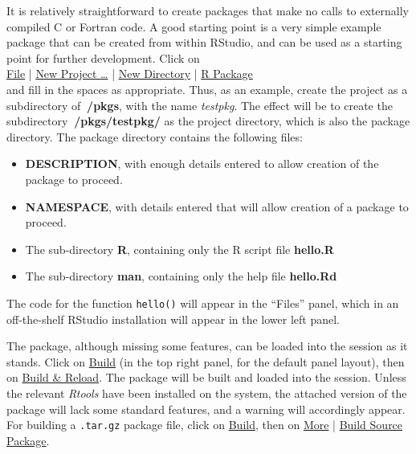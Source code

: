 \documentclass{tufte-book}\usepackage[]{graphicx}\usepackage[]{color}
\newcommand{\txtt}[1]{\texttt{#1}}
\begin{document}
It is relatively straightforward to create packages that make no calls
to externally compiled C or Fortran code. A good starting point is a
very simple example package that can be created from within RStudio,
and can be used as a starting point for further development.
Click on\\
\underline{File} | \underline{New Project \ldots} |
\underline{New Directory} | \underline{R Package} \\
\noindent and fill in the spaces as appropriate.  Thus, as an example,
create the project as a subdirectory of \textbf{$~$/pkgs}, with the
name {\em testpkg}.  The effect will be to create the subdirectory
\textbf{$~$/pkgs/testpkg/} as the project directory, which is also
the package directory.  The package directory contains the following
files:
\begin{itemize}

\item \textbf{DESCRIPTION}, with enough details entered to allow
creation of the package to proceed.
\item \textbf{NAMESPACE}, with details entered that will allow
creation of a package to proceed.
\item The sub-directory \textbf{R}, containing only the R script file
 \textbf{hello.R}
\item The sub-directory \textbf{man}, containing only the help file
 \textbf{hello.Rd}
\end{itemize}
The code for the function \txtt{hello()} will appear in the ``Files''
panel, which in an off-the-shelf RStudio installation will appear
in the lower left panel.

The package, although missing some features, can be loaded into the
session as it stands.  Click on \underline{Build} (in the top right
panel, for the default panel layout), then on \underline{Build \&
  Reload}.  The package will be built and loaded into the session.
Unless the relevant {\em Rtools} have been installed on the
system, the attached version of the package will lack some standard
features, and a warning will accordingly appear.  For
building a \txtt{.tar.gz} package file, click on
\underline{Build}, then on \underline{More} | \underline{Build Source
  Package}.
\end{document}
